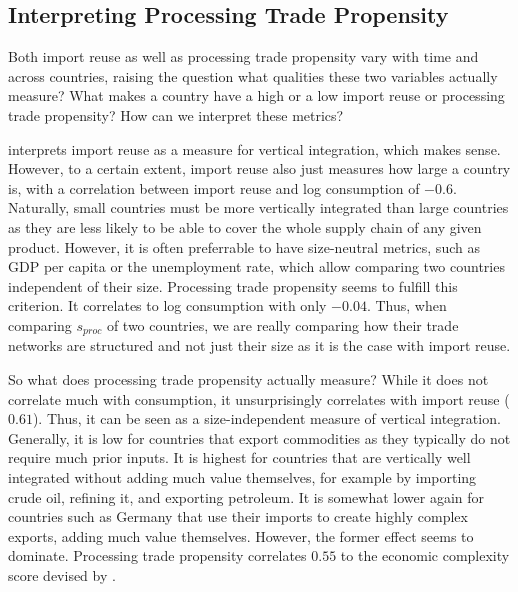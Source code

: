 \documentclass[english]{uzhpub}
\renewcommand{\baselinestretch}{1.5}
\begin{document}
\renewcommand{\baselinestretch}{1.5}

\subsection{Interpreting Processing Trade Propensity}
Both import reuse as well as processing trade propensity vary with time and across countries, raising the question what qualities these two variables actually measure? What makes a country have a high or a low import reuse or processing trade propensity? How can we interpret these metrics?

\cite{hummels2001nature} interprets import reuse as a measure for vertical integration, which makes sense. However, to a certain extent, import reuse also just measures how large a country is, with a correlation between import reuse and log consumption of $-0.6$. Naturally, small countries must be more vertically integrated than large countries as they are less likely to be able to cover the whole supply chain of any given product. However, it is often preferrable to have size-neutral metrics, such as GDP per capita or the unemployment rate, which allow comparing two countries independent of their size. Processing trade propensity seems to fulfill this criterion. It correlates to log consumption with only $-0.04$. Thus, when comparing $s_{proc}$ of two countries, we are really comparing how their trade networks are structured and not just their size as it is the case with import reuse.

So what does processing trade propensity actually measure? While it does not correlate much with consumption, it unsurprisingly correlates with import reuse ($0.61$). Thus, it can be seen as a size-independent measure of vertical integration. Generally, it is low for countries that export commodities as they typically do not require much prior inputs. It is highest for countries that are vertically well integrated without adding much value themselves, for example by importing crude oil, refining it, and exporting petroleum. It is somewhat lower again for countries such as Germany that use their imports to create highly complex exports, adding much value themselves. However, the former effect seems to dominate. Processing trade propensity correlates $0.55$ to the economic complexity score devised by \cite{hausmann2014atlas}.
\end{document}
